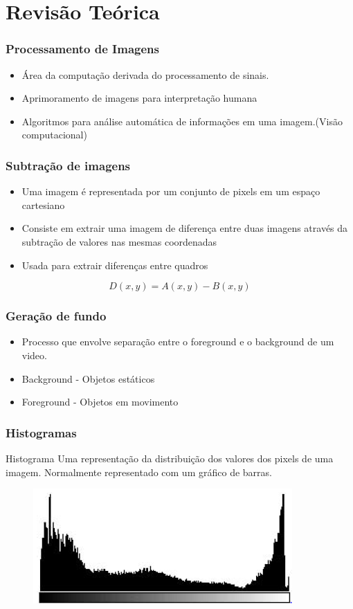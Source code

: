 \documentclass{beamer}
\begin{document}
\section{Revisão Teórica}
\begin{frame}
\frametitle{Processamento de Imagens}
\begin{itemize}
  \item Área da computação derivada do processamento de sinais.
  \item Aprimoramento de imagens para interpretação humana
  \item Algoritmos para análise automática de informações em uma imagem.(Visão computacional)
\end{itemize}

\end{frame}
\begin{frame}
\frametitle{Subtração de imagens}
\begin{itemize}
  \item Uma imagem é representada por um conjunto de pixels em um espaço cartesiano
  \item Consiste em extrair uma imagem  de diferença entre duas imagens através da subtração de valores nas mesmas coordenadas
  \item Usada para extrair diferenças entre quadros
\end{itemize}

\begin{equation}\label{diferenca}
  D(x,y) = A(x,y) - B(x,y)
\end{equation}

\end{frame}
\begin{frame}
\frametitle{Geração de fundo}
\begin{itemize}
  \item Processo que envolve separação entre o foreground e o background de um video.
  \item Background - Objetos estáticos
  \item Foreground - Objetos em movimento
\end{itemize}

\end{frame}
\begin{frame}
\frametitle{Histogramas}
\begin{block}{Histograma}
Uma representação da distribuição dos valores dos pixels de uma imagem. Normalmente representado com um gráfico de barras.
\end{block}

\begin{figure}
  \centering
  \includegraphics[width=.4\textwidth]{Histograma2}
\end{figure}

\end{frame}
\end{document}
